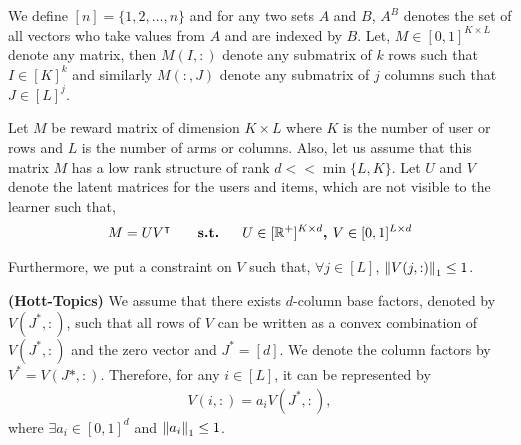 We define $[n] = \lbrace 1,2,\ldots, n\rbrace$ and for any two sets $A$ and $B$, $A^B$ denotes the set of all vectors who take values from $A$ and are indexed by $B$. Let, $M\in [0,1]^{K\times L}$ denote any matrix, then $M(I,:)$ denote any submatrix of $k$ rows such that $I\in[K]^k$ and similarly $M(:,J)$ denote any submatrix of $j$ columns such that $J\in[L]^{j}$.
	
	Let $M$ be reward matrix of  dimension $K\times L$ where $K$ is the number of user or rows and $L$ is the number of arms or columns. Also, let us assume that this matrix  $M$ has a low rank structure of rank $d << \min\lbrace L,K\rbrace$. Let $U$ and $V$ denote the latent matrices for the users and items, which are not visible to the learner such that,
\begin{align*}
	M = UV^{\intercal} \textbf{ \hspace*{4mm}   s.t.   \hspace*{4mm}} U\in [ \mathbb{R}^+ ]^{K\times d} \textbf{, } V\in  [0,1]^{L\times d} 
\end{align*}	  
	
	Furthermore, we put a constraint on $V$ such that, $\forall j\in [L]$, $ \left\lVert V(j,:)\right\rVert_1 \leq 1$. 
	
	
\begin{assumption}\textbf{(Hott-Topics)}
\label{assm:hott-topics}
We assume that there exists $d$-column base factors, denoted by $V(J^*,:)$, such that all rows of $V$ can be written as a convex combination of $V(J^*,:)$ and the zero vector and $J^* = [d]$. We denote the column factors by $V^* = V(J*,:)$. Therefore, for any $i\in [L]$, it can be represented by
\begin{align*}
V(i,:) = a_i V(J^*,:) , 
\end{align*}
where $\exists a_i\in [0,1]^{d}$ and $ \left\lVert a_i\right\rVert_1 \leq 1$.
\end{assumption}



